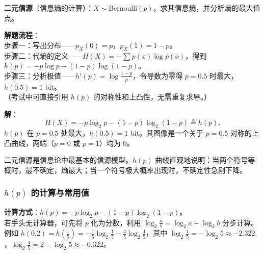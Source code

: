 \begin{example}
\label{ex:ch2-binary-source-entropy}
\textbf{二元信源}（信息熵的计算）：$X \sim \text{Bernoulli}(p)$，求其信息熵，并分析熵的最大值点。

\noindent \textbf{解题流程}：\\[2pt]
步骤一：写出分布——$p_X(0)=p$，$p_X(1)=1-p$。\\
步骤二：代熵的定义——$H(X)=-\sum p(x)\log p(x)$，得到 $h(p)=-p\log p-(1-p)\log(1-p)$。\\
步骤三：分析极值——$h'(p)=\log\frac{1-p}{p}$，令导数为零得 $p=0.5$ 时最大，$h(0.5)=1$ bit。\\
（考试中可直接引用 $h(p)$ 的对称性和上凸性，无需重复求导。）

\textbf{解}：\\[2pt]
\[
H(X) = -p\log_2 p - (1-p)\log_2(1-p) \triangleq h(p).
\]
$h(p)$ 在 $p=0.5$ 处最大，$h(0.5)=1$ bit。其图像是一个关于 $p=0.5$ 对称的上凸曲线，两端（$p=0$ 或 $p=1$）均为 0。

\begin{center}
\end{center}
\end{example}

二元信源是信息论中最基本的信源模型。$h(p)$ 曲线直观地说明：当两个符号等概时，最不确定，熵最大；当一个符号极大概率出现时，不确定性急剧下降。

\subsubsection*{$h(p)$ 的计算与常用值}

\textbf{计算方式}：$h(p)=-p\log_2 p-(1-p)\log_2(1-p)$。\\
若手头无计算器，可先将 $p$ 化为分数，利用 $\log_2\frac{a}{b}=\log_2 a-\log_2 b$ 分步计算。例如 $h(0.2)=h(\frac{1}{5})=-\frac{1}{5}\log_2\frac{1}{5}-\frac{4}{5}\log_2\frac{4}{5}$，其中 $\log_2\frac{1}{5}=-\log_2 5\approx -2.322$，$\log_2\frac{4}{5}=2-\log_2 5\approx -0.322$。

